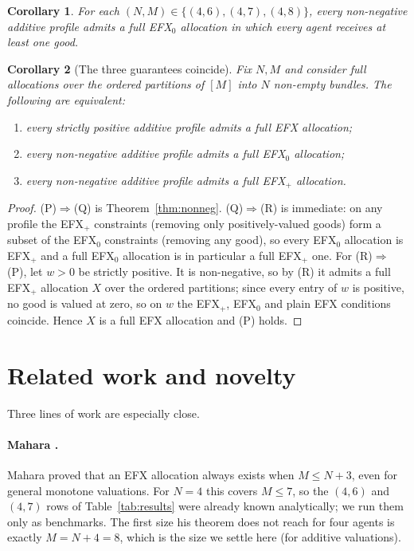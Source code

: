 \documentclass[11pt,a4paper]{article}
\theoremstyle{definition}
\theoremstyle{plain}
\newtheorem{corollary}{Corollary}
\newcommand{\EFX}{\textsf{EFX}}
\newcommand{\agents}{N}
\newcommand{\goods}{M}
\begin{document}
\begin{corollary}
\label{cor:nonneg}
For each $(\agents,\goods)\in\{(4,6),(4,7),(4,8)\}$, every non-negative additive
profile admits a full \EFX$_0$ allocation in which every agent receives at least
one good.
\end{corollary}

\begin{corollary}[The three guarantees coincide]
\label{cor:equiv}
Fix $\agents,\goods$ and consider full allocations over the ordered partitions of
$[\goods]$ into $\agents$ non-empty bundles. The following are equivalent:
\begin{enumerate}
  \item[\textnormal{(P)}] every strictly positive additive profile admits a full
        \EFX{} allocation;
  \item[\textnormal{(Q)}] every non-negative additive profile admits a full
        \EFX$_0$ allocation;
  \item[\textnormal{(R)}] every non-negative additive profile admits a full
        \EFX$_+$ allocation.
\end{enumerate}
\end{corollary}

\begin{proof}
(P)$\Rightarrow$(Q) is Theorem~\ref{thm:nonneg}. (Q)$\Rightarrow$(R) is immediate:
on any profile the \EFX$_+$ constraints (removing only positively-valued goods) form a
subset of the \EFX$_0$ constraints (removing any good), so every \EFX$_0$ allocation is
\EFX$_+$ and a full \EFX$_0$ allocation is in particular a full \EFX$_+$ one. For
(R)$\Rightarrow$(P), let $w>0$ be strictly positive. It is non-negative, so by (R) it
admits a full \EFX$_+$ allocation $X$ over the ordered partitions; since every entry of
$w$ is positive, no good is valued at zero, so on $w$ the \EFX$_+$, \EFX$_0$ and plain
\EFX{} conditions coincide. Hence $X$ is a full \EFX{} allocation and (P) holds.
\end{proof}

\section{Related work and novelty}
\label{sec:related}

Three lines of work are especially close.

\paragraph{Mahara \cite{Mahara2024}.}
Mahara proved that an \EFX{} allocation always exists when $\goods\leq\agents+3$,
even for general monotone valuations. For $\agents=4$ this covers $\goods\leq 7$,
so the $(4,6)$ and $(4,7)$ rows of Table~\ref{tab:results} were already known
analytically; we run them only as benchmarks. The first size his theorem does not
reach for four agents is exactly $\goods=\agents+4=8$, which is the size we settle
here (for additive valuations).
\end{document}
